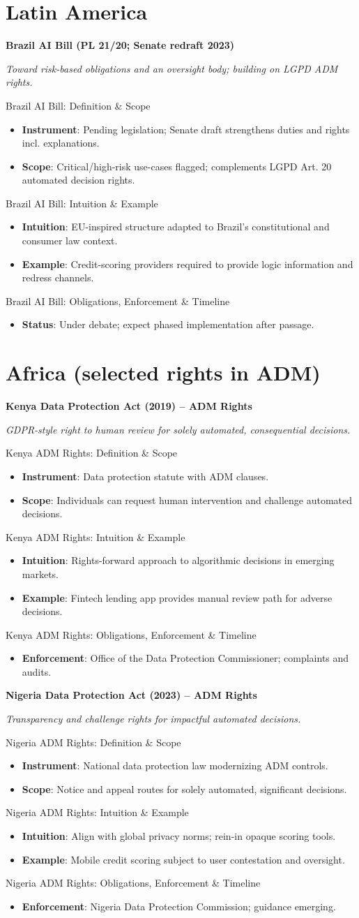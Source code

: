 \documentclass[aspectratio=169]{beamer}
\newcommand{\RegTitle}[2]{%
  \begin{frame}[plain]
    \centering
    \vfill
    {\usebeamerfont{title}\usebeamercolor[fg]{title}\LARGE \textbf{#1}\par}
    \vspace{0.4em}
    {\small \itshape #2\par}
    \vfill
  \end{frame}
}
\newcommand{\RegDef}[2]{%
  \begin{frame}{#1: Definition \& Scope}
    \begin{itemize}
      #2
    \end{itemize}
  \end{frame}
}
\newcommand{\RegIntuition}[2]{%
  \begin{frame}{#1: Intuition \& Example}
    \begin{itemize}
      #2
    \end{itemize}
  \end{frame}
}
\newcommand{\RegCompliance}[2]{%
  \begin{frame}{#1: Obligations, Enforcement \& Timeline}
    \begin{itemize}
      #2
    \end{itemize}
  \end{frame}
}
\begin{document}
\section{Latin America}

\RegTitle{Brazil AI Bill (PL 21/20; Senate redraft 2023)}{Toward risk-based obligations and an oversight body; building on LGPD ADM rights.}
\RegDef{Brazil AI Bill}{%
  \item \textbf{Instrument}: Pending legislation; Senate draft strengthens duties and rights incl. explanations.
  \item \textbf{Scope}: Critical/high-risk use-cases flagged; complements LGPD Art. 20 automated decision rights.
}
\RegIntuition{Brazil AI Bill}{%
  \item \textbf{Intuition}: EU-inspired structure adapted to Brazil's constitutional and consumer law context.
  \item \textbf{Example}: Credit-scoring providers required to provide logic information and redress channels.
}
\RegCompliance{Brazil AI Bill}{%
  \item \textbf{Status}: Under debate; expect phased implementation after passage.
}

\section{Africa (selected rights in ADM)}

\RegTitle{Kenya Data Protection Act (2019) -- ADM Rights}{GDPR-style right to human review for solely automated, consequential decisions.}
\RegDef{Kenya ADM Rights}{%
  \item \textbf{Instrument}: Data protection statute with ADM clauses.
  \item \textbf{Scope}: Individuals can request human intervention and challenge automated decisions.
}
\RegIntuition{Kenya ADM Rights}{%
  \item \textbf{Intuition}: Rights-forward approach to algorithmic decisions in emerging markets.
  \item \textbf{Example}: Fintech lending app provides manual review path for adverse decisions.
}
\RegCompliance{Kenya ADM Rights}{%
  \item \textbf{Enforcement}: Office of the Data Protection Commissioner; complaints and audits.
}

\RegTitle{Nigeria Data Protection Act (2023) -- ADM Rights}{Transparency and challenge rights for impactful automated decisions.}
\RegDef{Nigeria ADM Rights}{%
  \item \textbf{Instrument}: National data protection law modernizing ADM controls.
  \item \textbf{Scope}: Notice and appeal routes for solely automated, significant decisions.
}
\RegIntuition{Nigeria ADM Rights}{%
  \item \textbf{Intuition}: Align with global privacy norms; rein-in opaque scoring tools.
  \item \textbf{Example}: Mobile credit scoring subject to user contestation and oversight.
}
\RegCompliance{Nigeria ADM Rights}{%
  \item \textbf{Enforcement}: Nigeria Data Protection Commission; guidance emerging.
}
\end{document}
